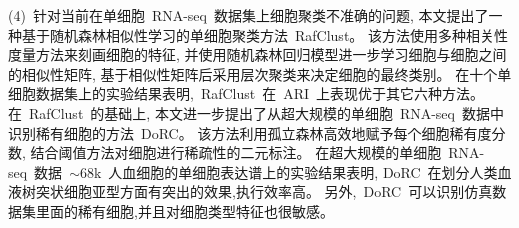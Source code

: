 \begin{abstractcn}
(4)~针对当前在单细胞~RNA-seq~数据集上细胞聚类不准确的问题,
本文提出了一种基于随机森林相似性学习的单细胞聚类方法~RafClust。
该方法使用多种相关性度量方法来刻画细胞的特征, 
并使用随机森林回归模型进一步学习细胞与细胞之间的相似性矩阵,
基于相似性矩阵后采用层次聚类来决定细胞的最终类别。
在十个单细胞数据集上的实验结果表明,~RafClust~在~ARI~上表现优于其它六种方法。
在~RafClust~的基础上, 
本文进一步提出了从超大规模的单细胞~RNA-seq~数据中识别稀有细胞的方法~DoRC。
该方法利用孤立森林高效地赋予每个细胞稀有度分数,
结合阈值方法对细胞进行稀疏性的二元标注。
在超大规模的单细胞~RNA-seq~数据~${\sim}68$k~人血细胞的单细胞表达谱上的实验结果表明,
DoRC~在划分人类血液树突状细胞亚型方面有突出的效果,执行效率高。
另外,~DoRC~可以识别仿真数据集里面的稀有细胞,并且对细胞类型特征也很敏感。


\end{abstractcn}
